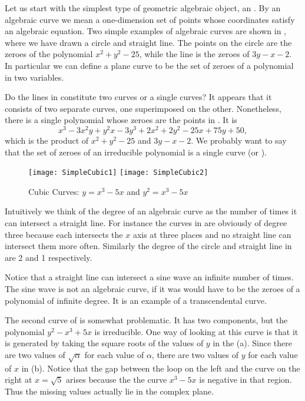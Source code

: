 Let us start with the simplest type of geometric algebraic object, an
.  By an algebraic curve we mean a one-dimension
set of points whose coordinates satisfy an algebraic equation.  Two
simple examples of algebraic curves are shown in ,
where we have drawn a circle and straight line.  The points on the
circle are the zeroes of the polynomial $x^2 + y^2 - 25$, while the
line is the zeroes of $3y - x - 2$.  In particular we can define a
plane curve to be the set of zeroes of a polynomial in two variables.

Do the lines in  constitute two curves or a single
curves?  It appears that it consists of two separate curves, one
superimposed on the other.  Nonetheless, there is a single polynomial
whose zeroes are the points in .  It is
\[
x^3 - 3 x^2 y + y^2 x - 3 y^3 + 2 x^2 + 2 y^2 - 25 x + 75 y + 50,
\]
which is the product of $x^2 + y^2 - 25$ and $3y - x - 2$.  We
probably want to say that the set of zeroes of an irreducible
polynomial is a single curve (or ).

\begin{figure}
\begin{center}
  \texttt{[image: SimpleCubic1]}
    \hfil 
  \texttt{[image: SimpleCubic2]}
\end{center}
\caption{Cubic Curves: $y = x^3 - 5x$ and $y^2 = x^3 - 5x$}
\label{Simple:Cubic:Fig}
\end{figure}

Intuitively we think of the degree of an algebraic curve as the number of
times it can intersect a straight line.  For instance the curves in
 are obviously of degree three because each
intersects the $x$ axis at three places and no straight line can intersect
them more often.  Similarly the degree of the circle and straight line in
 are 2 and 1 respectively.

Notice that a straight line can intersect a sine wave an infinite number of
times.  The sine wave is not an algebraic curve, if it was would have to be the
zeroes of a polynomial of infinite degree.  It is an example of a
transcendental curve.

The second curve of  is somewhat problematic.
It has two components, but the polynomial $y^2 - x^3 + 5x$ is
irreducible.  One way of looking at this curve is that it is generated
by taking the square roots of the values of $y$ in the
(a).  Since there are two values of
$\sqrt{\alpha}$ for each value of $\alpha$, there are two values of
$y$ for each value of $x$ in (b).  Notice
that the gap between the loop on the left and the curve on the right
at $x = \sqrt{5}$ arises because the the curve $x^3 - 5x$ is negative
in that region.  Thus the missing values actually lie in the complex
plane.

